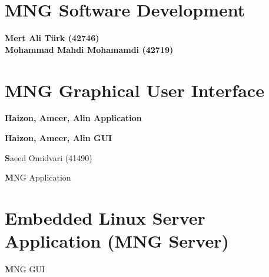 \documentclass[11pt, a4paper]{report}
\begin{document}
\chapter{MNG Software Development}

\clearpage 
\newpage
\null 
\vfill
\begin{center}
\textbf{\large Mert Ali Türk (42746)\\ 
Mohammad Mahdi Mohamamdi (42719)}
\end{center}
\vfill
{}
\clearpage

\chapter{MNG Graphical User Interface}


\clearpage 
\null 
\vfill 
\begin{center}
{\textbf {\large Haizon, Ameer, Alin Application }} 
\end{center}
\vfill 
\thispagestyle{empty}
\clearpage





\clearpage 
\null 
\vfill 
\begin{center}
{\large \textbf{ Haizon, Ameer, Alin GUI}} 
\end{center}
\vfill 
\thispagestyle{empty}
\clearpage


\clearpage 
\null 
\vfill 
\begin{center}
{\large \textbf Saeed Omidvari (41490)} 
\end{center}
\vfill 
\thispagestyle{empty}
\clearpage


\clearpage 
\null 
\vfill 
\begin{center}
{\large \textbf MNG Application} 
\end{center}
\vfill 
{}
\clearpage	

\chapter{Embedded Linux Server Application
(MNG Server)}


\clearpage 
\null 
\vfill 
\begin{center}
{\large \textbf MNG GUI }
\end{center}
\vfill 
{}
\clearpage
\end{document}

